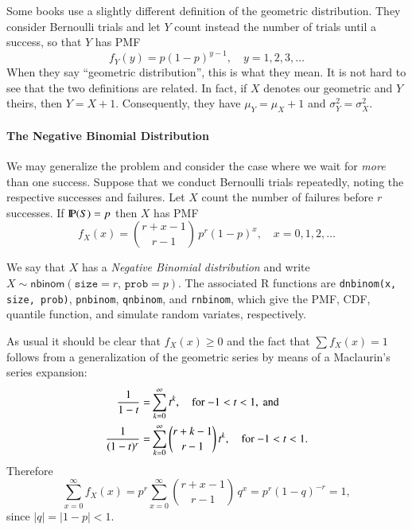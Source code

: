 \documentclass[captions=tableheading]{scrbook}
\begin{document}
\begin{note}
Some books use a slightly different definition of the geometric distribution. They consider Bernoulli trials and let \(Y\) count instead the number of trials until a success, so that \(Y\) has PMF
\begin{equation}
f_{Y}(y)=p(1-p)^{y-1},\quad y=1,2,3,\ldots
\end{equation}
When they say ``geometric distribution'', this is what they mean. It is not hard to see that the two definitions are related. In fact, if \(X\) denotes our geometric and \(Y\) theirs, then \(Y=X+1\). Consequently, they have \(\mu_{Y}=\mu_{X}+1\) and \(\sigma_{Y}^{2}=\sigma_{X}^{2}\).
\end{note}

\paragraph*{The Negative Binomial Distribution}
\label{sub:The-Negative-Binomial}

We may generalize the problem and consider the case where we wait for \emph{more} than one success. Suppose that we conduct Bernoulli trials repeatedly, noting the respective successes and failures. Let \(X\) count the number of failures before \(r\) successes. If \(\P(S)=p\) then \(X\) has PMF
\begin{equation}
f_{X}(x)={r+x-1 \choose r-1}\, p^{r}(1-p)^{x},\quad x=0,1,2,\ldots
\end{equation}

We say that \(X\) has a \emph{Negative Binomial distribution} and write \(X\sim\mathsf{nbinom}(\mathtt{size}=r,\,\mathtt{prob}=p)\). The associated \textsf{R} functions are \texttt{dnbinom(x, size, prob)}, \texttt{pnbinom}, \texttt{qnbinom}, and \texttt{rnbinom}, which give the PMF, CDF, quantile function, and simulate random variates, respectively.

As usual it should be clear that \(f_{X}(x)\geq 0\) and the fact that \(\sum f_{X}(x)=1\) follows from a generalization of the geometric series by means of a Maclaurin's series expansion:
\begin{alignat}{1}
\frac{1}{1-t}= & \sum_{k=0}^{\infty}t^{k},\quad\mbox{for \ensuremath{-1<t<1}},\mbox{ and}\\
\frac{1}{(1-t)^{r}}= & \sum_{k=0}^{\infty}{r+k-1 \choose r-1}\, t^{k},\quad\mbox{for \ensuremath{-1<t<1}}.
\end{alignat}
Therefore
\begin{equation}
\sum_{x=0}^{\infty}f_{X}(x)=p^{r}\sum_{x=0}^{\infty}{r+x-1 \choose r-1}\, q^{x}=p^{r}(1-q)^{-r}=1,
\end{equation}
since \(|q|=|1-p|<1\). 
\end{document}
